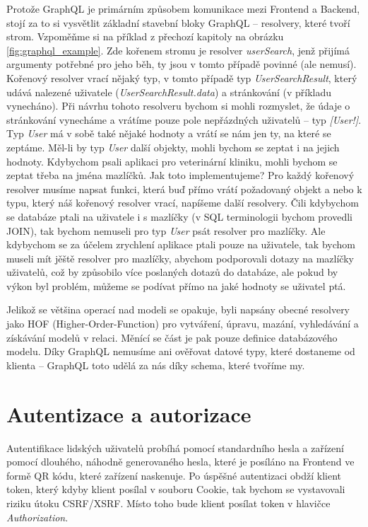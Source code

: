 Protože GraphQL je primárním způsobem komunikace mezi Frontend a Backend, stojí za to si vysvětlit základní stavební bloky
GraphQL -- resolvery, které tvoří strom. Vzpoměňme si na příklad z přechozí kapitoly na obrázku \ref{fig:graphql_example}.
Zde kořenem stromu je resolver \textit{userSearch}, jenž přijímá argumenty potřebné pro jeho běh, ty jsou v tomto případě
povinné (ale nemusí). Kořenový resolver vrací nějaký typ, v tomto případě typ \textit{UserSearchResult}, který udává nalezené
uživatele (\textit{UserSearchResult.data}) a stránkování (v příkladu vynecháno).
Při návrhu tohoto resolveru bychom si mohli rozmyslet, že údaje o stránkování vynecháme a vrátíme pouze
pole nepřázdných uživatelů -- typ \textit{[User!]}.
Typ \textit{User} má v sobě také nějaké hodnoty a vrátí se nám jen ty, na které se zeptáme. Měl-li by typ \textit{User}
další objekty, mohli bychom se zeptat i na jejich hodnoty. Kdybychom psali aplikaci pro veterinární kliniku, mohli bychom se zeptat
třeba na jména mazlíčků.
Jak toto implementujeme? Pro každý kořenový resolver musíme napsat funkci, která buď přímo vrátí požadovaný objekt a nebo
k typu, který náš kořenový resolver vrací, napíšeme další resolvery. Čili kdybychom se databáze ptali na uživatele i s
mazlíčky (v SQL terminologii bychom provedli JOIN), tak bychom nemuseli pro typ \textit{User} psát resolver pro mazlíčky.
Ale kdybychom se za účelem zrychlení aplikace ptali pouze na uživatele, tak bychom museli mít jěště resolver pro mazlíčky, abychom
podporovali dotazy na mazlíčky uživatelů, což by způsobilo více poslaných dotazů do databáze, ale pokud by výkon byl problém,
můžeme se podívat přímo na jaké hodnoty se uživatel ptá.
\citep[viz][]{GraphQLDoc}

Jelikož se většina operací nad modeli se opakuje, byli napsány obecné resolvery jako HOF (Higher-Order-Function)
pro vytváření, úpravu, mazání, vyhledávání a získávání modelů v relaci.
Měnící se část je pak pouze definice databázového modelu. Díky GraphQL nemusíme ani ověřovat datové typy, které dostaneme od klienta --
GraphQL toto udělá za nás díky schema, které tvoříme my.

\section{Autentizace a autorizace} \label{auther_authen}

Autentifikace lidských uživatelů probíhá pomocí standardního hesla a zařízení pomocí dlouhého, náhodně generovaného hesla,
které je posíláno na Frontend ve formě QR kódu, které zařízení naskenuje.
Po úspěšné autentizaci obdží klient token, který kdyby klient posílal v souboru Cookie,
tak bychom se vystavovali riziku útoku CSRF/XSRF.
Místo toho bude klient posílat token v hlavičce \textit{Authorization}.

